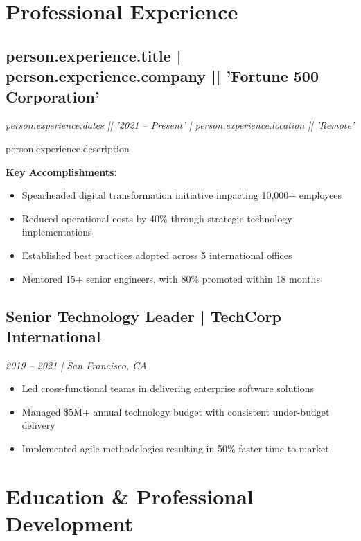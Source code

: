 \documentclass[11pt,a4paper]{article}
\begin{document}
\section{Professional Experience}

\subsection{{{person.experience.title}} | {{person.experience.company || 'Fortune 500 Corporation'}}}
\textit{{{person.experience.dates || '2021 -- Present'}} | {{person.experience.location || 'Remote'}}}

{{person.experience.description}}

\noindent\textbf{Key Accomplishments:}
\begin{itemize}[leftmargin=*, topsep=0pt, itemsep=2pt]
    \item Spearheaded digital transformation initiative impacting 10,000+ employees
    \item Reduced operational costs by 40\% through strategic technology implementations
    \item Established best practices adopted across 5 international offices
    \item Mentored 15+ senior engineers, with 80\% promoted within 18 months
\end{itemize}

\subsection{Senior Technology Leader | TechCorp International}
\textit{2019 -- 2021 | San Francisco, CA}

\begin{itemize}[leftmargin=*, topsep=0pt, itemsep=2pt]
    \item Led cross-functional teams in delivering enterprise software solutions
    \item Managed \$5M+ annual technology budget with consistent under-budget delivery
    \item Implemented agile methodologies resulting in 50\% faster time-to-market
\end{itemize}

\section{Education \& Professional Development}
\end{document}
